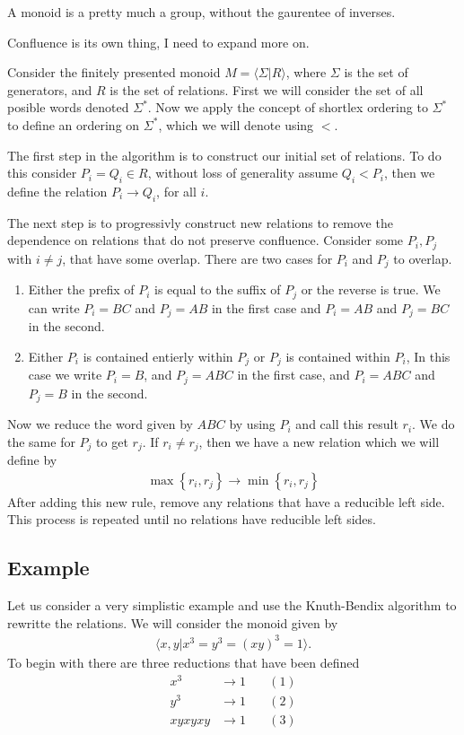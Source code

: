 \documentclass[10pt]{amsart}
\theoremstyle{definition}
\begin{document}
A monoid is a pretty much a group, without the gaurentee of inverses.

Confluence is its own thing, I need to expand more on.

Consider the finitely presented monoid $M=\langle \Sigma\vert R\rangle$, where
$\Sigma$ is the set of generators, and $R$ is the set of relations. First we
will consider the set of all posible words denoted $\Sigma^*$. Now we apply the
concept of shortlex ordering to $\Sigma^*$ to define an ordering on $\Sigma^*$,
which we will denote using $<$.

The first step in the algorithm is to construct our initial set of relations.
To do this consider $P_i=Q_i\in R$, without loss of generality assume
$Q_i<P_i$, then we define the relation $P_i\rightarrow Q_i$, for all $i$.

The next step is to progressivly construct new relations to remove the
dependence on relations that do not preserve confluence. Consider some
$P_i,P_j$ with $i\neq j$, that have some overlap. There are two cases for $P_i$
and $P_j$ to overlap.
\begin{enumerate}
  \item Either the prefix of $P_i$ is equal to the suffix of $P_j$ or the
    reverse is true. We can write $P_i=BC$ and $P_j=AB$ in the first case and
    $P_i=AB$ and $P_j=BC$ in the second.
  \item Either $P_i$ is contained entierly within $P_j$ or $P_j$ is contained
    within $P_i$, In this case we write $P_i=B$, and $P_j=ABC$ in the first
    case, and $P_i=ABC$ and $P_j=B$ in the second.
\end{enumerate}
Now we reduce the word given by $ABC$ by using $P_i$ and call this result
$r_i$. We do the same for $P_j$ to get $r_j$. If $r_i\neq r_j$, then we have a
new relation which we will define by
\begin{align*}
  \max\left\{r_i,r_j\right\}\rightarrow\min\left\{r_i,r_j\right\}
\end{align*}
After adding this new rule, remove any relations that have a reducible left
side. This process is repeated until no relations have reducible left sides.

\subsection{Example}%
\label{sub:example}

Let us consider a very simplistic example and use the Knuth-Bendix algorithm to
rewritte the relations. We will consider the monoid given by
\begin{align*}
  \langle x,y\vert x^3=y^3={(xy)}^3=1\rangle.
\end{align*}
To begin with there are three reductions that have been defined
\begin{align*}
  x^3&\rightarrow1\quad&(1)\\
  y^3&\rightarrow1\quad&(2)\\
  xyxyxy&\rightarrow1\quad&(3)
\end{align*}
\end{document}
